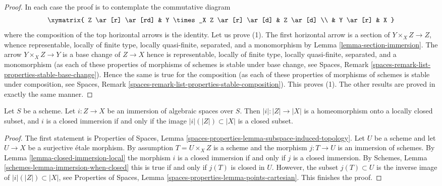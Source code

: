 \begin{proof}
In each case the proof is to contemplate the commutative diagram
$$
\xymatrix{
Z \ar[r] \ar[rd] & Y \times_X Z \ar[r] \ar[d] & Z \ar[d] \\
& Y \ar[r] & X
}
$$
where the composition of the top horizontal arrows is the identity.
Let us prove (1). The first horizontal arrow is a section of
$Y \times_X Z \to Z$, whence representable, locally of finite type,
locally quasi-finite, separated, and a monomorphism by
Lemma \ref{lemma-section-immersion}.
The arrow $Y \times_X Z \to Y$ is a base change of $Z \to X$
hence is representable, locally of finite type,
locally quasi-finite, separated, and a monomorphism
(as each of these properties of morphisms of schemes is stable
under base change, see
Spaces, Remark \ref{spaces-remark-list-properties-stable-base-change}).
Hence the same is true for the composition (as each of these properties of
morphisms of schemes is stable under composition, see Spaces, Remark
\ref{spaces-remark-list-properties-stable-composition}).
This proves (1). The other results are proved in exactly the same manner.
\end{proof}

\begin{lemma}
\label{lemma-immersion-when-closed}
Let $S$ be a scheme. Let $i : Z \to X$ be an immersion of algebraic
spaces over $S$. Then $|i| : |Z| \to |X|$ is a homeomorphism onto a
locally closed subset, and $i$ is a closed immersion if and only if
the image $|i|(|Z|) \subset |X|$ is a closed subset.
\end{lemma}

\begin{proof}
The first statement is Properties of Spaces, Lemma
\ref{spaces-properties-lemma-subspace-induced-topology}.
Let $U$ be a scheme and let $U \to X$ be a surjective \'etale morphism.
By assumption $T = U \times_X Z$ is a scheme and the morphism $j : T \to U$
is an immersion of schemes. By Lemma \ref{lemma-closed-immersion-local}
the morphism $i$ is a closed immersion if and only if $j$ is a closed
immersion. By Schemes, Lemma \ref{schemes-lemma-immersion-when-closed}
this is true if and only if $j(T)$ is closed in $U$.
However, the subset $j(T) \subset U$ is the inverse image of
$|i|(|Z|) \subset |X|$, see
Properties of Spaces, Lemma \ref{spaces-properties-lemma-points-cartesian}.
This finishes the proof.
\end{proof}

